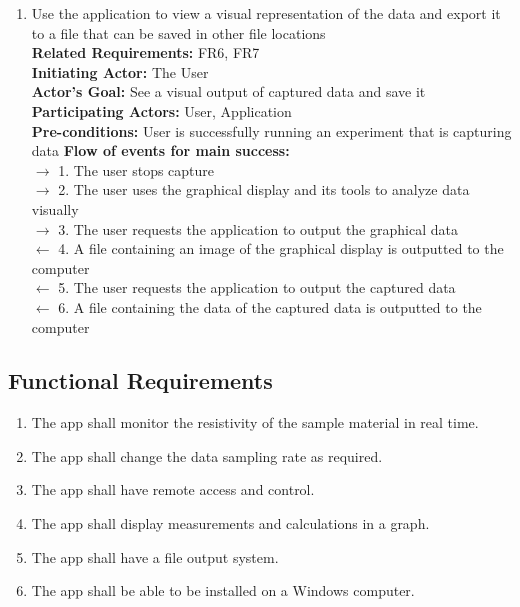 \documentclass[12pt, titlepage]{article}
\begin{document}
\begin{enumerate}[{UC-}1:]
\item Use the application to view a visual representation of the data and export it to a file that can be saved in other file locations \label{UC3}\\
    \textbf{Related Requirements:} FR6, FR7\\ %
    \textbf{Initiating Actor:} The User\\
    \textbf{Actor's Goal:} See a visual output of captured data and save it\\
    \textbf{Participating Actors:} User, Application\\
    \textbf{Pre-conditions:} User is successfully running an experiment that is capturing data
    \textbf{Flow of events for main success:}\\
    $\rightarrow$ 1. The user stops capture\\
    $\rightarrow$ 2. The user uses the graphical display and its tools to analyze data visually\\
    $\rightarrow$ 3. The user requests the application to output the graphical data\\
    $\leftarrow$ 4. A file containing an image of the graphical display is outputted to the computer\\
    $\leftarrow$ 5. The user requests the application to output the captured data\\
    $\leftarrow$ 6. A file containing the data of the captured data is outputted to the computer
    
\color{black}
\end{enumerate}

\subsection{Functional Requirements}
\begin{enumerate}[{FR}1.] 
    \item \label{FR1}
    The app shall monitor the resistivity of the sample material in real time. 
    \item \label{FR2}
    The app shall change the data sampling rate as required.
    \item \label{FR3}
    The app shall have remote access and control.
    \item \label{FR4}
    The app shall display measurements and calculations in a graph.
    \item \label{FR5}
    The app shall have a file output system.
    \item \label{FR6}
    The app shall be able to be installed on a Windows computer. \\
	
\end{enumerate}
\end{document}
